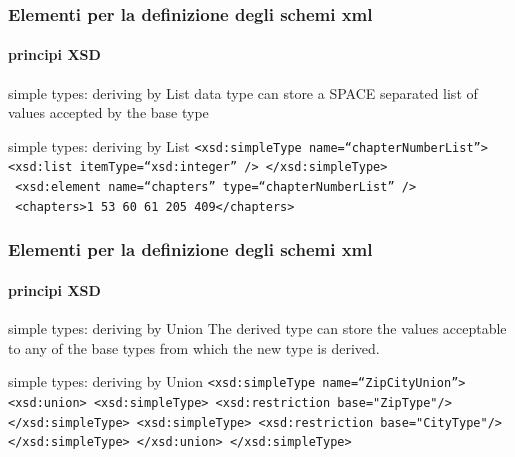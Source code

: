 \begin{frame}
	\frametitle{Elementi per la definizione degli schemi xml}
	\framesubtitle{principi XSD}
	\addtocounter{nframe}{1}

	\begin{block}{simple types: deriving by List}
		data type can store a SPACE separated list of values accepted by the base type
	\end{block}

	\begin{block}{simple types: deriving by List}
		\texttt{<xsd:simpleType name=``chapterNumberList''>
			<xsd:list itemType=``xsd:integer'' />
			</xsd:simpleType>}
		\\\texttt{
			<xsd:element name=``chapters'' type=``chapterNumberList'' />}
		\\\texttt{
			<chapters>1 53 60 61 205 409</chapters>}
	\end{block}

\end{frame}

\begin{frame}
	\frametitle{Elementi per la definizione degli schemi xml}
	\framesubtitle{principi XSD}
	\addtocounter{nframe}{1}

	\begin{block}{simple types: deriving by Union}
		The derived type can store the values acceptable to any of the base types from which the new type is derived.
	\end{block}

	\begin{block}{simple types: deriving by Union}
		\texttt{<xsd:simpleType name=``ZipCityUnion''>
			<xsd:union>
			<xsd:simpleType>
			<xsd:restriction base="ZipType"/>
			</xsd:simpleType>
			<xsd:simpleType>
			<xsd:restriction base="CityType"/>
			</xsd:simpleType>
			</xsd:union>
			</xsd:simpleType>}

	\end{block}

\end{frame}





